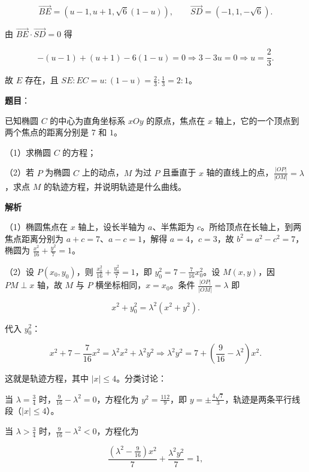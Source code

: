 \begin{answer}
\nopagebreak[4]
\[\overrightarrow{BE}=\left(u-1,u+1,\sqrt6(1-u)\right),\qquad
\overrightarrow{SD}=(-1,1,-\sqrt6).\]

由 $\overrightarrow{BE}\cdot\overrightarrow{SD}=0$ 得

\nopagebreak[4]
\[-(u-1)+(u+1)-6(1-u)=0\Longrightarrow 3-3u=0\Longrightarrow u=\frac23 .\]

故 $E$ 存在，且 $SE:EC=u:(1-u)=\frac23:\frac13=2:1$。


\end{answer}
\begin{answer}

\textbf{题目}：

已知椭圆 $C$ 的中心为直角坐标系 $xOy$ 的原点，焦点在 $x$ 轴上，它的一个顶点到两个焦点的距离分别是 $7$ 和 $1$。

（1）求椭圆 $C$ 的方程；

（2）若 $P$ 为椭圆 $C$ 上的动点，$M$ 为过 $P$ 且垂直于 $x$ 轴的直线上的点，$\frac{|OP|}{|OM|}=\lambda$，求点 $M$ 的轨迹方程，并说明轨迹是什么曲线。

\textbf{解析}

（1）椭圆焦点在 $x$ 轴上，设长半轴为 $a$、半焦距为 $c$。所给顶点在长轴上，到两焦点距离分别为 $a+c=7$、$a-c=1$，解得 $a=4$，$c=3$，故 $b^2=a^2-c^2=7$，椭圆为 $\frac{x^2}{16}+\frac{y^2}{7}=1$。

（2）设 $P(x_0,y_0)$，则 $\frac{x_0^2}{16}+\frac{y_0^2}{7}=1$，即 $y_0^2=7-\frac7{16}x_0^2$。设 $M(x,y)$，因 $PM\perp x$ 轴，故 $M$ 与 $P$ 横坐标相同，$x=x_0$。条件 $\frac{|OP|}{|OM|}=\lambda$ 即

\nopagebreak[4]
\[x^2+y_0^2=\lambda^2(x^2+y^2) .\]

代入 $y_0^2$：

\nopagebreak[4]
\[x^2+7-\frac7{16}x^2=\lambda^2x^2+\lambda^2y^2
\Longrightarrow \lambda^2y^2=7+\left(\frac9{16}-\lambda^2\right)x^2 .\]

这就是轨迹方程，其中 $|x|\leqslant4$。分类讨论：

当 $\lambda=\frac34$ 时，$\frac9{16}-\lambda^2=0$，方程化为 $y^2=\frac{112}{9}$，即 $y=\pm\frac{4\sqrt7}{3}$，轨迹是两条平行线段（$|x|\leqslant4$）。

当 $\lambda>\frac34$ 时，$\frac9{16}-\lambda^2<0$，方程化为

\nopagebreak[4]
\[\frac{\left(\lambda^2-\frac9{16}\right)x^2}{7}+\frac{\lambda^2y^2}{7}=1,\]


\end{answer}
